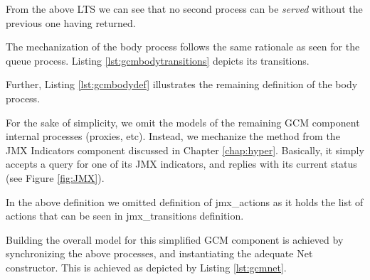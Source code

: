 	\noindent From the above \ac{LTS} we can see that no second process can be \textit{served} without the
	previous one having returned.
	
		The mechanization of the body process follows the same rationale as seen for the queue process.
	Listing \ref{lst:gcmbodytransitions} depicts its transitions.

			
	

	\noindent Further, Listing \ref{lst:gcmbodydef} illustrates the remaining definition of the body process. 

				

	
	For the sake of simplicity,	we omit the models of the remaining \ac{GCM} component internal processes (proxies, etc).
	Instead, we mechanize the method from the \textsf{JMX Indicators} component discussed in Chapter \ref{chap:hyper}.
	Basically, it simply accepts a query for one of its \ac{JMX} indicators, and replies with its current status (see Figure \ref{fig:JMX}).
		
	
			
	
		
	\noindent In the above definition we omitted definition of \textsf{jmx\_actions} as it
	holds the list of \textsf{actions} that can be seen in \textsf{jmx\_transitions} definition.
	
		Building the	overall model for this simplified \ac{GCM} component is achieved by synchronizing
		the above processes, and instantiating the adequate \textsf{Net} constructor. This is achieved
		as depicted by Listing \ref{lst:gcmnet}.
		
		
				
	
